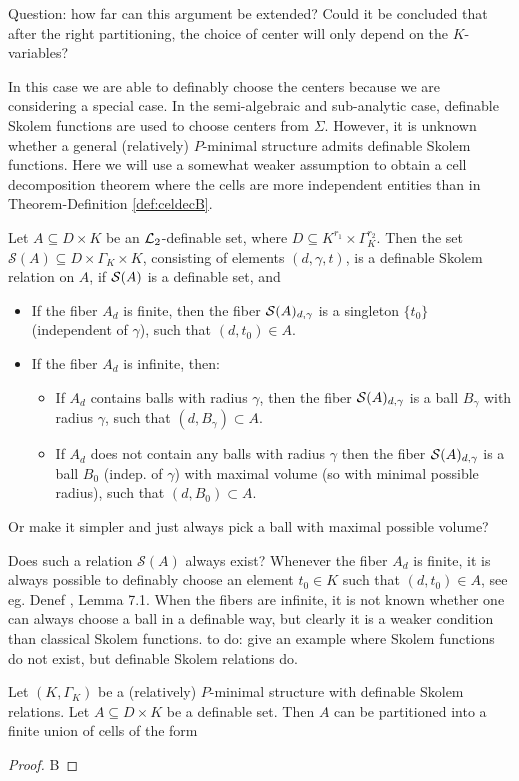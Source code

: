 {\color{blue} Question: how far can this argument be extended? Could it be concluded that after the right partitioning, the choice of center will only depend on the $K$-variables?}

In this case we are able to definably choose the centers because we are considering a special case. In the semi-algebraic and sub-analytic case, definable Skolem functions are used to choose centers from $\Sigma$. However, it is unknown whether a general (relatively) $P$-minimal structure admits definable Skolem functions. Here we will use a somewhat weaker assumption to obtain a cell decomposition theorem where the cells are more independent entities than in Theorem-Definition \ref{def:celdecB}.

\begin{defn}
Let $A \subseteq D \times K$ be an $\mathcal{L}_2$-definable set, where $D \subseteq K^{r_1} \times \Gamma_K^{r_2}$. Then the set $\mathcal{S}(A)\subseteq D \times \Gamma_K\times K$, consisting of elements $(d,\gamma,t)$, is a definable Skolem relation on $A$, if ${\mathcal S}(A)$ is a definable set, and
\begin{itemize}
\item If the fiber $A_d$ is finite, then the fiber ${\mathcal S}(A)_{d,\gamma}$ is a singleton $\{t_0\}$ (independent of $\gamma$), such that $(d, t_0) \in A$.
\item If the fiber $A_d$ is infinite, then:
\begin{itemize}
\item If $A_d$ contains balls with radius $\gamma$, then the fiber ${\mathcal S}(A)_{d,\gamma}$ is a ball $B_\gamma$ with radius $\gamma$, such that $(d,B_{\gamma}) \subset A$. 
\item If $A_d$ does not contain any balls with radius $\gamma$ then the fiber ${\mathcal S}(A)_{d,\gamma}$ is a ball $B_0$ (indep. of $\gamma$) with maximal volume (so with minimal possible radius), such that $(d,B_0) \subset A$.
\end{itemize}
\end{itemize}
{\color{red} Or make it simpler and just always pick a ball with maximal possible volume?}   
\end{defn}
Does such a relation $\mathcal{S}(A)$ always exist? Whenever the fiber $A_d$ is finite, it is always possible to definably choose an element $t_0 \in K$ such that $(d,t_0) \in A$, see eg. Denef \cite{denef-84}, Lemma 7.1. When the fibers are infinite, it is not known whether one can always choose a ball in a definable way, but clearly it is a weaker condition than classical Skolem functions. {\color{red} to do: give an example where Skolem functions do not exist, but definable Skolem relations do.}
\begin{thm}
 Let $(K, \Gamma_K)$ be a {\color{red}(relatively)} $P$-minimal structure with definable Skolem relations. Let $A \subseteq D \times K$ be a definable set. Then $A$ can be partitioned into a finite union of cells of the form
\end{thm}
\begin{proof}
B
\end{proof}




